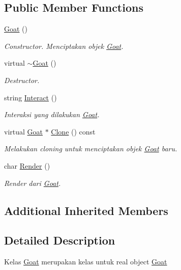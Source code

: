\subsection*{Public Member Functions}
\begin{DoxyCompactItemize}
\item 
\hyperlink{classGoat_acf506b76c8503c9749df191a92dc99f9}{Goat} ()
\begin{DoxyCompactList}\small\item\em Constructor. Menciptakan objek \hyperlink{classGoat}{Goat}. \end{DoxyCompactList}\item 
virtual \hyperlink{classGoat_a47af45317eec8718356b20a10e31af27}{$\sim$\+Goat} ()
\begin{DoxyCompactList}\small\item\em Destructor. \end{DoxyCompactList}\item 
string \hyperlink{classGoat_a5f480d88c50724cee8c7a9d18f486144}{Interact} ()
\begin{DoxyCompactList}\small\item\em Interaksi yang dilakukan \hyperlink{classGoat}{Goat}. \end{DoxyCompactList}\item 
virtual \hyperlink{classGoat}{Goat} $\ast$ \hyperlink{classGoat_a1532200ef20734bb42d0a1306b14d8ad}{Clone} () const 
\begin{DoxyCompactList}\small\item\em Melakukan cloning untuk menciptakan objek \hyperlink{classGoat}{Goat} baru. \end{DoxyCompactList}\item 
char \hyperlink{classGoat_aedea4680fe17571c2f51d35b90397f6e}{Render} ()
\begin{DoxyCompactList}\small\item\em Render dari \hyperlink{classGoat}{Goat}. \end{DoxyCompactList}\end{DoxyCompactItemize}
\subsection*{Additional Inherited Members}


\subsection{Detailed Description}
Kelas \hyperlink{classGoat}{Goat} merupakan kelas untuk real object \hyperlink{classGoat}{Goat} 


